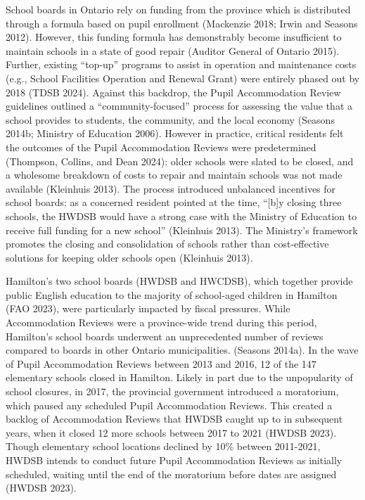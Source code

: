 \documentclass[
default
]{sn-jnl}
\begin{document}
School boards in Ontario rely on funding from the province which is
distributed through a formula based on pupil enrollment (Mackenzie 2018;
Irwin and Seasons 2012). However, this funding formula has demonstrably
become insufficient to maintain schools in a state of good repair
(Auditor General of Ontario 2015). Further, existing ``top-up'' programs
to assist in operation and maintenance costs (e.g., School Facilities
Operation and Renewal Grant) were entirely phased out by 2018 (TDSB
2024). Against this backdrop, the Pupil Accommodation Review guidelines
outlined a ``community-focused'' process for assessing the value that a
school provides to students, the community, and the local economy
(Seasons 2014b; Ministry of Education 2006). However in practice,
critical residents felt the outcomes of the Pupil Accommodation Reviews
were predetermined (Thompson, Collins, and Dean 2024): older schools
were slated to be closed, and a wholesome breakdown of costs to repair
and maintain schools was not made available (Kleinhuis 2013). The
process introduced unbalanced incentives for school boards: as a
concerned resident pointed at the time, ``{[}b{]}y closing three
schools, the HWDSB would have a strong case with the Ministry of
Education to receive full funding for a new school'' (Kleinhuis 2013).
The Ministry's framework promotes the closing and consolidation of
schools rather than cost-effective solutions for keeping older schools
open (Kleinhuis 2013).

Hamilton's two school boards (HWDSB and HWCDSB), which together provide
public English education to the majority of school-aged children in
Hamilton (FAO 2023), were particularly impacted by fiscal pressures.
While Accommodation Reviews were a province-wide trend during this
period, Hamilton's school boards underwent an unprecedented number of
reviews compared to boards in other Ontario municipalities. (Seasons
2014a). In the wave of Pupil Accommodation Reviews between 2013 and
2016, 12 of the 147 elementary schools closed in Hamilton. Likely in
part due to the unpopularity of school closures, in 2017, the provincial
government introduced a moratorium, which paused any scheduled Pupil
Accommodation Reviews. This created a backlog of Accommodation Reviews
that HWDSB caught up to in subsequent years, when it closed 12 more
schools between 2017 to 2021 (HWDSB 2023). Though elementary school
locations declined by 10\% between 2011-2021, HWDSB intends to conduct
future Pupil Accommodation Reviews as initially scheduled, waiting until
the end of the moratorium before dates are assigned (HWDSB 2023).
\end{document}
